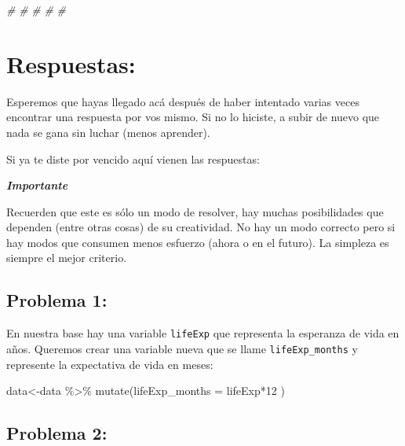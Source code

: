 \documentclass[
]{book}
\newenvironment{Shaded}{\begin{snugshade}}{\end{snugshade}}
\newcommand{\AttributeTok}[1]{\textcolor[rgb]{0.77,0.63,0.00}{#1}}
\newcommand{\CommentTok}[1]{\textcolor[rgb]{0.56,0.35,0.01}{\textit{#1}}}
\newcommand{\DecValTok}[1]{\textcolor[rgb]{0.00,0.00,0.81}{#1}}
\newcommand{\FunctionTok}[1]{\textcolor[rgb]{0.00,0.00,0.00}{#1}}
\newcommand{\NormalTok}[1]{#1}
\newcommand{\OtherTok}[1]{\textcolor[rgb]{0.56,0.35,0.01}{#1}}
\newcommand{\SpecialCharTok}[1]{\textcolor[rgb]{0.00,0.00,0.00}{#1}}
\begin{document}
\begin{Shaded}
\begin{Highlighting}[]
\CommentTok{\#}
\CommentTok{\#}
\CommentTok{\#}
\CommentTok{\#}
\CommentTok{\#}
\end{Highlighting}
\end{Shaded}

\hypertarget{respuestas}{%
\section{\texorpdfstring{ Respuestas:}{ Respuestas:}}\label{respuestas}}

Esperemos que hayas llegado acá después de haber intentado varias veces encontrar una respuesta por vos mismo. Si no lo hiciste, a subir de nuevo que nada se gana sin luchar (menos aprender).

Si ya te diste por vencido aquí vienen las respuestas:

\textbf{\emph{Importante}}

Recuerden que este es sólo un modo de resolver, hay muchas posibilidades que dependen (entre otras cosas) de su creatividad. No hay un modo correcto pero si hay modos que consumen menos esfuerzo (ahora o en el futuro). La simpleza es siempre el mejor criterio.

\hypertarget{problema-1-1}{%
\subsection{Problema 1:}\label{problema-1-1}}

En nuestra base hay una variable \texttt{lifeExp} que representa la esperanza de vida en años. Queremos crear una variable nueva que se llame \texttt{lifeExp\_months} y represente la expectativa de vida en meses:

\begin{Shaded}
\begin{Highlighting}[]
\NormalTok{data}\OtherTok{\textless{}{-}}\NormalTok{data }\SpecialCharTok{\%\textgreater{}\%} \FunctionTok{mutate}\NormalTok{(}\AttributeTok{lifeExp\_months =}\NormalTok{ lifeExp}\SpecialCharTok{*}\DecValTok{12}\NormalTok{ )}
\end{Highlighting}
\end{Shaded}

\hypertarget{problema-2-1}{%
\subsection{Problema 2:}\label{problema-2-1}}
\end{document}

